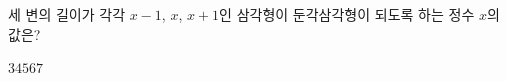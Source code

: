 \hspace*{2mm}\begin{minipage}[t]{\dimexpr\linewidth-2mm\relax}\vspace{0pt}
세 변의 길이가 각각 $x-1$, $x$, $x+1$인 삼각형이 둔각삼각형이 되도록 하는 정수 $x$의 값은?
\begin{choices32}{$3$}{$4$}{$5$}{$6$}{$7$}\end{choices32}\end{minipage}
